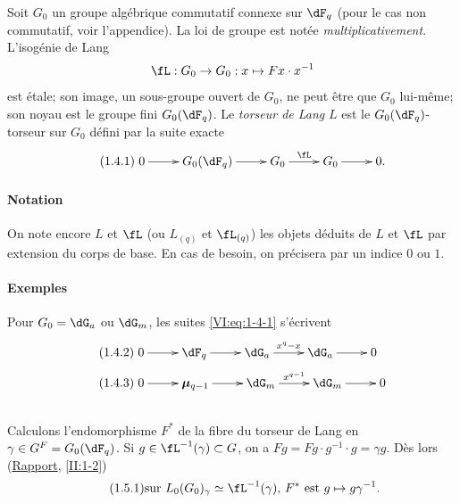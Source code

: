 \documentclass[oneside]{book}
\newcommand{\dmu}{{\bm\mu}}
\theoremstyle{sga-source}
\theoremstyle{sga-source-dash}
\theoremstyle{sga-source-dotdash}
\theoremstyle{sga-source-number-note-dash}
\theoremstyle{sga-source-note-number-dotdash}
\theoremstyle{sga-source-example-dotdash}
\theoremstyle{sga-source-inline-number}
\theoremstyle{sga-source-bare-number}
\theoremstyle{sga-source}
\newcommand{\PrintPage}[1]{}\newcommand{\MathPage}[1]{}\newcommand{\PrintCite}[2]{#1}\newcommand{\var}[3]{#2}
\begin{document}
Soit $G_0$ un groupe algébrique commutatif connexe sur $\dF_q$ (pour le cas 
non commutatif, voir l'appendice). La loi de groupe est notée 
\emph{multiplicativement}. L'isogénie de Lang 
\[
\fL:G_0 \to G_0: x\mapsto F x\cdot x^{-1}
\]
est étale; son image, un sous-groupe ouvert de $G_0$, ne peut être que 
$G_0$ lui-même; son noyau est le groupe fini $G_0(\dF_q)$. Le \emph{torseur 
de Lang} $L$ est le $G_0(\dF_q)$-torseur sur $G_0$ défini par la suite 
exacte 
\begin{equation*}\tag{1.4.1}\label{VI:eq:1-4-1}
\xymatrix{
  0 \ar[r] 
    & G_0(\dF_q) \ar[r] 
    & G_0 \ar[r]^-\fL 
    & G_0 \ar[r] 
    & 0 \text{.}
}
\end{equation*}


\paragraph{Notation}
On note encore $L$ et $\fL$ (ou $L_{(q)}$ et $\fL_{(q)}$) les \var{objects}{objets}{S45-SOL-0682} déduits 
de $L$ et $\fL$ par extension du corps de base. En cas de besoin, on 
précisera par un indice $0$ ou $1$.


\PrintPage{172}
\paragraph{Exemples}
Pour $G_0=\dG_a$ ou $\dG_m$, les suites \eqref{VI:eq:1-4-1} s'écrivent 
\begin{align*}\tag{1.4.2}\label{VI:eq:1-4-2}
&\xymatrix{
  0 \ar[r] 
    & \dF_q \ar[r] 
    & \dG_a \ar[r]^-{x^q-x} 
    & \dG_a \ar[r] 
    & 0 
} \\
\tag{1.4.3}\label{VI:eq:1-4-3}
&\xymatrix{
  0 \ar[r] 
    & \dmu_{q-1} \ar[r] 
    & \dG_m \ar[r]^-{x^{q-1}} 
    & \dG_m \ar[r] 
    & 0
}
\end{align*}





\subsection{}\label{VI:1-5}

Calculons l'endomorphisme $F^\ast$ de la fibre du torseur de Lang en 
$\gamma\in G^F=G_0(\dF_q)$. Si $g\in \fL^{-1}(\gamma)\subset G$, on a 
$F g = F g\cdot g^{-1}\cdot g = \gamma g$. Dès lors (\hyperref[II]{Rapport}, 
\ref{II:1-2}) 
\begin{equation*}\tag{1.5.1}\label{VI:eq:1-5-1}
  \text{sur $L_0(G_0)_\gamma\simeq \fL^{-1}(\gamma)$, $F^\ast$ est $g\mapsto g\gamma^{-1}$.}
\end{equation*}
\end{document}
